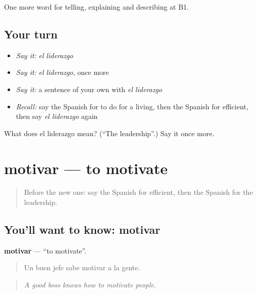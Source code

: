 \begin{grammarlens}[title={What you've built}]
One more word for telling, explaining and describing at B1.
\end{grammarlens}

\subsection*{Your turn}
\begin{itemize}
\raggedright
  \item \emph{Say it:} \emph{el liderazgo}
  \item \emph{Say it:} \emph{el liderazgo}, once more
  \item \emph{Say it:} a sentence of your own with \emph{el liderazgo}
  \item \emph{Recall:} say the Spanish for to do for a living, then the Spanish for efficient, then say \emph{el liderazgo} again
\end{itemize}

\begin{tcolorbox}[breakable,colback=teal!4,colframe=teal!35!black,title={Before you move on}]
What does el liderazgo mean? (\textquotedblleft{}The leadership\textquotedblright{}.) Say it once more.
\end{tcolorbox}
\section[motivar]{motivar — to motivate}

\label{lesson:ES-C594-motivar}



\begin{quote}
Before the new one: say the Spanish for efficient, then the Spanish for the leadership.
\end{quote}

\subsection*{You'll want to know: motivar}
\textbf{motivar} — \textquotedblleft{}to motivate\textquotedblright{}.

\begin{quote}
Un buen jefe sabe motivar a la gente.
\end{quote}

\begin{quote}
\emph{A good boss knows how to motivate people.}
\end{quote}

